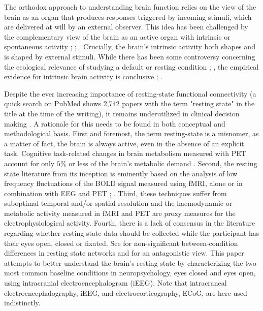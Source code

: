 \documentclass[11pt, onecolumn]{article}
\begin{document}
The orthodox approach to understanding brain function relies on the view of the brain as an organ that produces responses triggered by incoming stimuli, which are delivered at will by an external observer. This idea has been challenged by the complementary view of the brain as an active organ with intrinsic or spontaneous activity \citep{llinas_intrinsic_1988}; \citep{biswal_functional_1995}; \citep{papo2013should}. Crucially, the brain's intrinsic activity both shapes and is shaped by external stimuli.
While there has been some controversy concerning the ecological relevance of studying a default or resting condition \citep{buckner2007unrest}; \citep{morcom2007does}, the empirical evidence for intrinsic brain activity is conclusive \citep{wang2006changes}; \citep{mantini2007electrophysiological}. 

Despite the ever increasing importance of resting-state functional connectivity (a quick search on PubMed shows 2,742 papers with the term "resting state" in the title at the time of the writing), it remains underutilized in clinical decision making \citep{tracy2015resting}.
A rationale for this needs to be found in both conceptual and methodological basis. First and foremost, the term resting-state is a misnomer, as a matter of fact, the brain is always active, even in the absence of an explicit task. Cognitive task-related changes in brain metabolism measured with PET account for only $5\%$ or less of the brain's metabolic demand \citep{sokoloff1955effect}. 
Second, the resting state literature from its inception is eminently based on the analysis of low frequency fluctuations of the BOLD signal measured using fMRI, alone or in combination with EEG and PET \citep{van2010exploring}; \citep{musso2010spontaneous}. Third, these techniques suffer from suboptimal temporal and/or spatial resolution and the haemodynamic or metabolic activity measured in fMRI and PET are proxy measures for the electrophysiological activity. Fourth, there is a lack of consensus in the literature regarding whether resting state data should be collected while the participant has their eyes open, closed or fixated. See \citep{patriat2013effect} for non-significant between-condition differences in resting state networks and \citep{yan2009spontaneous} for an antagonistic view. 
This paper attempts to better understand the brain's resting state by characterizing the two most common baseline conditions in neuropsychology, eyes closed and eyes open, using intracranial electroencephalogram (iEEG). Note that intracraneal electroencephalography, iEEG, and electrocorticography, ECoG, are here used indistinctly.
\end{document}
